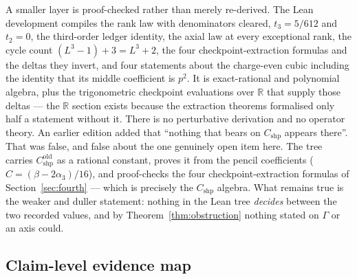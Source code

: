 \documentclass[11pt]{article}
\theoremstyle{plain}
\theoremstyle{definition}
\theoremstyle{remark}
\begin{document}
A smaller layer is proof-checked rather than merely re-derived. The Lean
development compiles the rank law with denominators cleared, $t_3=5/612$ and
$t_2=0$, the third-order ledger identity, the axial law at every exceptional
rank, the cycle count $(L^3-1)+3=L^3+2$, the four checkpoint-extraction
formulas and the deltas they invert, and four statements about the charge-even
cubic including the identity that its middle coefficient is $p^2$. It is
exact-rational and polynomial algebra, plus the trigonometric checkpoint
evaluations over $\mathbb R$ that supply those deltas --- the $\mathbb R$
section exists because the extraction theorems formalised only half a
statement without it. There is no perturbative derivation and no operator
theory. An earlier edition added that ``nothing that bears on
$C_{\mathrm{shp}}$ appears there''. That was false, and false about the one
genuinely open item here. The tree carries $C_{\mathrm{shp}}^{\mathrm{old}}$
as a rational constant, proves it from the pencil coefficients
($C=(\beta-2\alpha_3)/16$), and proof-checks the four checkpoint-extraction
formulas of Section~\ref{sec:fourth} --- which is precisely the
$C_{\mathrm{shp}}$ algebra. What remains true is the weaker and duller
statement: nothing in the Lean tree \emph{decides} between the two recorded
values, and by Theorem~\ref{thm:obstruction} nothing stated on $\Gamma$ or an
axis could.

\subsection{Claim-level evidence map}
\end{document}
